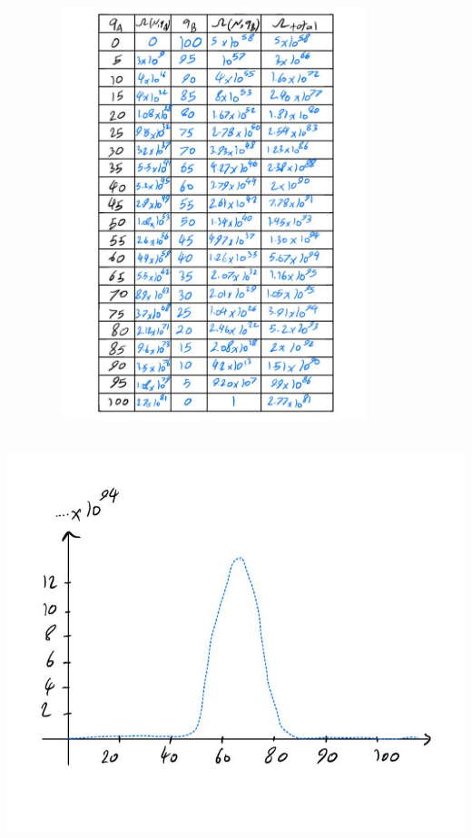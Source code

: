 \documentclass[fleqn]{article}
\begin{document}
\begin{enumerate}
        \begin{center}
          \includegraphics[height=12cm, width=12cm]{5.JPG}
        \end{center}

        \begin{center}
          \includegraphics[height=12cm, width=15cm]{6.JPG}
        \end{center}


\end{enumerate}
\end{document}
